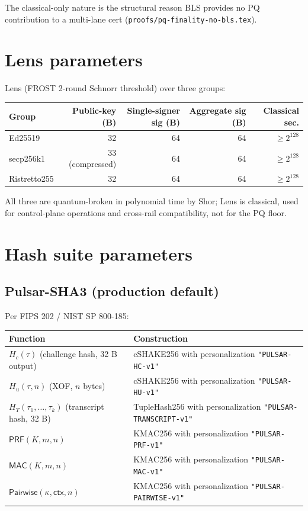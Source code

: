 \documentclass[11pt,a4paper]{article}
\begin{document}
The classical-only nature is the structural reason BLS provides no PQ contribution to a multi-lane cert (\texttt{proofs/pq-finality-no-bls.tex}).

\section{Lens parameters}

Lens (FROST 2-round Schnorr threshold) over three groups:

\begin{tabular}{@{}lrrrr@{}}
  \toprule
  \textbf{Group} & \textbf{Public-key (B)} & \textbf{Single-signer sig (B)} & \textbf{Aggregate sig (B)} & \textbf{Classical sec.} \\
  \midrule
  Ed25519        & 32 & 64 & 64 & $\geq 2^{128}$ \\
  secp256k1      & 33 (compressed) & 64 & 64 & $\geq 2^{128}$ \\
  Ristretto255   & 32 & 64 & 64 & $\geq 2^{128}$ \\
  \bottomrule
\end{tabular}

All three are quantum-broken in polynomial time by Shor; Lens is classical, used for control-plane operations and cross-rail compatibility, not for the PQ floor.

\section{Hash suite parameters}

\subsection{Pulsar-SHA3 (production default)}

Per FIPS 202 / NIST SP 800-185:

\begin{tabular}{@{}p{}p{}@{}}
  \toprule
  \textbf{Function} & \textbf{Construction} \\
  \midrule
  $H_c(\tau)$ (challenge hash, 32 B output) & cSHAKE256 with personalization \texttt{"PULSAR-HC-v1"} \\
  $H_u(\tau, n)$ (XOF, $n$ bytes) & cSHAKE256 with personalization \texttt{"PULSAR-HU-v1"} \\
  $H_T(\tau_1, \ldots, \tau_k)$ (transcript hash, 32 B) & TupleHash256 with personalization \texttt{"PULSAR-TRANSCRIPT-v1"} \\
  $\mathsf{PRF}(K, m, n)$ & KMAC256 with personalization \texttt{"PULSAR-PRF-v1"} \\
  $\mathsf{MAC}(K, m, n)$ & KMAC256 with personalization \texttt{"PULSAR-MAC-v1"} \\
  $\mathsf{Pairwise}(\kappa, \mathsf{ctx}, n)$ & KMAC256 with personalization \texttt{"PULSAR-PAIRWISE-v1"} \\
  \bottomrule
\end{tabular}
\end{document}
